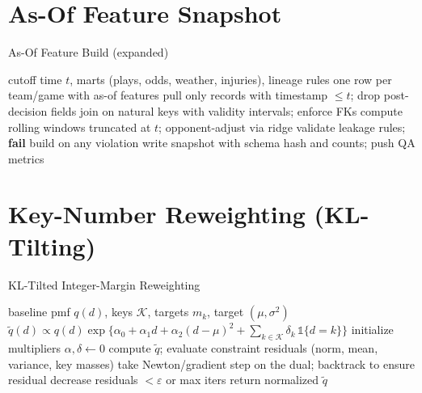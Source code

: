 \section{As-Of Feature Snapshot}
\begin{algorithm}[H]\small
  \caption{As-Of Feature Build (expanded)}
  \label{alg:asof-build}
  \begin{algorithmic}[1]
    \Require cutoff time $t$, marts (plays, odds, weather, injuries), lineage rules
    \Ensure one row per team/game with as-of features
    \State pull only records with timestamp $\le t$; drop post-decision fields
    \State join on natural keys with validity intervals; enforce FKs
    \State compute rolling windows truncated at $t$; opponent-adjust via ridge
    \State validate leakage rules; \textbf{fail} build on any violation
    \State write snapshot with schema hash and counts; push QA metrics
  \end{algorithmic}
\end{algorithm}

\section{Key-Number Reweighting (KL-Tilting)}
\begin{algorithm}[H]\small
  \caption{KL-Tilted Integer-Margin Reweighting}
  \label{alg:kl-tilt}
  \begin{algorithmic}[1]
    \Require baseline pmf $q(d)$, keys $\mathcal K$, targets $m_k$, target $(\mu,\sigma^2)$
    \Ensure $\tilde q(d) \propto q(d)\exp\{\alpha_0+\alpha_1 d+\alpha_2 (d-\mu)^2+\sum_{k\in\mathcal K}\delta_k\,\mathbb{1}\{d=k\}\}$
    \State initialize multipliers $\alpha,\delta \leftarrow 0$
    \Repeat
      \State compute $\tilde q$; evaluate constraint residuals (norm, mean, variance, key masses)
      \State take Newton/gradient step on the dual; backtrack to ensure residual decrease
    \Until residuals $< \varepsilon$ or max iters
    \State return normalized $\tilde q$
  \end{algorithmic}
\end{algorithm}

